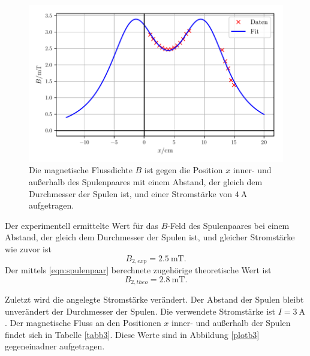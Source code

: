 \begin{figure}
    \centering
    \includegraphics{build/plotb2.pdf}
    \caption{Die magnetische Flussdichte $B$ ist gegen die Position $x$ inner-
    und außerhalb des Spulenpaares mit einem Abstand, der gleich dem Durchmesser
    der Spulen ist, und einer Stromstärke von $\SI{4}{\ampere}$ aufgetragen.}
    \label{plotb2}
\end{figure}

\noindent Der experimentell ermittelte Wert für das $B$-Feld
des Spulenpaares bei einem Abstand, der gleich dem Durchmesser
der Spulen ist, und gleicher Stromstärke wie zuvor ist 
\begin{equation*}
   B_{2,exp} = \SI{2.5}{\milli\tesla}.
\end{equation*}
Der mittels \eqref{eqn:spulenpaar} berechnete zugehörige theoretische Wert
ist 
\begin{equation*}
   B_{2,theo} = \SI{2.8}{\milli\tesla}.
\end{equation*}

\noindent Zuletzt wird die angelegte Stromstärke verändert. Der Abstand
der Spulen bleibt unverändert der Durchmesser der Spulen.
Die verwendete Stromstärke ist $I = \SI{3}{\ampere}$.
Der magnetische Fluss an den Positionen $x$ inner- und außerhalb
der Spulen findet sich in Tabelle \ref{tabb3}.
Diese Werte sind in Abbildung \ref{plotb3} gegeneinadner
aufgetragen.


